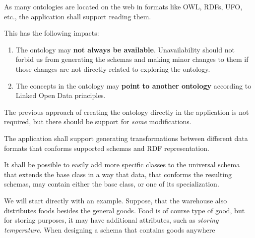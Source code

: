 

\begin{requirement}
    \label{requirement:ontologies-on-the-web}
    As many ontologies are located on the web in formats like OWL, RDFs, UFO, etc., the application shall support reading them.
\end{requirement}

This has the following impacts:
\begin{enumerate}
    \item The ontology may \textbf{not always be available}. Unavailability should not forbid us from generating the schemas and making minor changes to them if those changes are not directly related to exploring the ontology.
    \item The concepts in the ontology may \textbf{point to another ontology} according to Linked Open Data principles.
\end{enumerate}

\begin{requirement}
    \label{requirement:pim-editing}
    The previous approach of creating the ontology directly in the application is not required, but there should be support for \textit{some} modifications.
\end{requirement}

\begin{requirement}
    The application shall support generating transformations between different data formats that conforms supported schemas and RDF representation.
\end{requirement}




\begin{requirement}
    It shall be possible to easily add more specific classes to the universal schema that extends the base class in a way that data, that conforms the resulting schemas, may contain either the base class, or one of its specialization.
\end{requirement}

\begin{showcase}
    We will start directly with an example. Suppose, that the warehouse also distributes foods besides the general goods. Food is of course type of good, but for storing purposes, it may have additional attributes, such as \textit{storing temperature}. When designing a schema that contains goods anywhere


\end{showcase}

